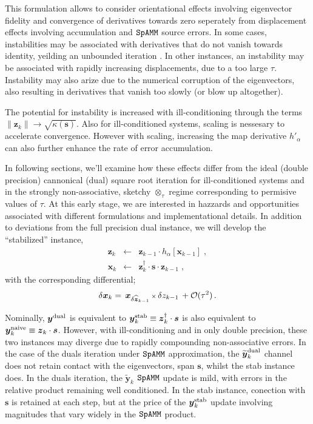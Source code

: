 \documentclass[letterpaper,twocolumn,amsmath,amsfont,amssymb,english,aps,jcp,preprintnumbers,groupaddress,nofootinbib,tightenlines]{revtex4}
\newcommand{\mat}[1]{\boldsymbol{#1}}
\newcommand{\ot}{ {\scriptstyle \otimes}_{ \tau } }
\begin{document}
This formulation allows to consider orientational effects involving eigenvector fidelity and convergence of 
derivatives towards zero seperately from displacement effects involving accumulation and $\tt SpAMM$ source errors.
In some cases, instabilities may be associated with derivatives that do not vanish towards identity, yeilding an unbounded iteration \cite{}.
In other instances, an instability may be associated with rapidly increasing displacements, due to a too large $\tau$.  Instability 
may also arize due to the numerical corruption of the eigenvectors, also resulting in derivatives that vanish too slowly (or blow up altogether).    

The potential for
instability is increased with ill-conditioning through the terms $\lVert \mat{z}_{k} \rVert  \rightarrow \sqrt{\kappa\left(\mat{s} \right)}$.
Also for ill-conditioned systems, scaling is nessesary to accelerate convergence.  However with scaling, increasing the map 
derivative $h'_\alpha$ can also further enhance the rate of error accumulation. 

In following sections, we'll examine how these effects differ from the ideal (double precision) cannonical (dual) square root iteration
for ill-conditioned systems and in the strongly non-associative, sketchy $\ot$ regime corresponding to permisive values of $\tau$.
At this early stage, we are interested in hazzards and opportunities associated with
different formulations and implementational details.   In addition to deviations from the full precision dual instance,
we will develop the  ``stabilized'' instance,
\begin{eqnarray}\label{stabilized}
\mat{z}_k &\leftarrow& \mat{z}_{k-1} \cdot h_\alpha \left[ \mat{x}_{k-1} \right] \; , \nonumber \\
\mat{x}_k &\leftarrow&  \mat{z}^\dagger_{k} \cdot \mat{s} \cdot \mat{z}_{k-1} \; ,
\end{eqnarray}
with the corresponding differential;
\begin{equation} \label{firstorder}
\delta \mat{x}_k = \,  { \mat{x}}_{\delta \widehat{\mat{z}}_{k-1}}  \, {\scriptstyle \times} \, \delta z_{k-1}  \, + {\cal O}(\tau^2)  \, .
\end{equation}


Nominally, $\mat{y}^{\rm dual}$ is equivalent to $\mat{y}^{\rm stab}_k \equiv \mat{z}^\dagger_{k} \cdot \mat{s}$ 
is also equivalent to $\mat{y}^{\rm naive}_k \equiv \mat{z}_{k} \cdot \mat{s}$.
However, with ill-conditioning and in only double precision, these two instances may diverge due to rapidly compounding non-associative errors. 
In the case of the duals iteration under $\tt SpAMM$ approximation, the $\widetilde{\mat{y}}^{\rm dual}_k$ channel does not retain contact 
with the eigenvectors, span $\mat{s}$, whilst the stab instance does.  
In the duals iteration, the $\widetilde{\mat{y}}_k$  $\tt SpAMM$ update 
is mild, with errors in the relative product remaining well conditioned.  
In the stab instance, conection with $\mat{s}$ is retained at each step, but at the price of the 
$\mat{y}^{\rm stab}_k$ update involving magnitudes that vary widely in the $\tt SpAMM$ product.     
\end{document}
